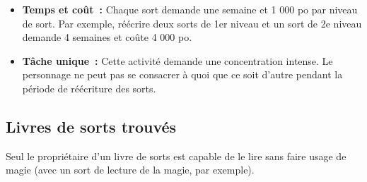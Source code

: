 \begin{itemize}
  \item \textbf{Temps et coût~:} Chaque sort demande une semaine et 1 000 po
  par niveau de sort. Par exemple, réécrire deux sorts de 1er niveau et
  un sort de 2e niveau demande 4 semaines et coûte 4 000 po.
  \item \textbf{Tâche unique~:} Cette activité demande une concentration
  intense. Le personnage ne peut pas se consacrer à quoi que ce soit
  d'autre pendant la période de réécriture des sorts.
\end{itemize}

\subsection{Livres de sorts trouvés}\label{livres-de-sorts-trouvuxe9s}

Seul le propriétaire d'un livre de sorts est capable de le lire sans
faire usage de magie (avec un sort de lecture de la magie, par exemple).